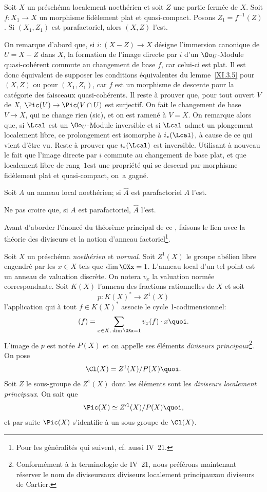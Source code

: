 \begin{lemme} \label{XI.3.6} Soit $X$ un pr\'esch\'ema localement noeth\'erien et soit $Z$ une partie ferm\'ee de $X$. Soit $f\colon X_1\to X$ un morphisme fid\`element plat et quasi-compact. Posons $Z_1=f^{-1}(Z)$. Si $(X_1, Z_1)$ est parafactoriel, alors $(X, Z)$ l'est.
\end{lemme}

On remarque d'abord que, si $i\colon(X-Z)\to X$ d\'esigne l'immersion canonique de $U=X-Z$ dans $X$, la formation de l'image directe par $i$ d'un $\Oo_U$-Module quasi-coh\'erent commute au changement de base $f$, car celui-ci est plat. Il est donc \'equivalent de supposer les conditions \'equivalentes du lemme~\ref{XI.3.5} pour $(X, Z)$ ou pour $(X_1, Z_1)$, car $f$ est un morphisme de descente pour la cat\'egorie des faisceaux quasi-coh\'erents. Il reste \`a prouver que, pour tout ouvert $V$ de $X$, $\Pic(V)\to\Pic(V\cap U)$ est surjectif. On fait le changement de base $V\to X$, qui ne change rien (sic), et on est ramen\'e \`a $V=X$. On remarque alors que, si ${\Lcal}$ est un $\Oo_U$-Module inversible et si ${\Lcal}$ admet un plongement localement libre, ce prolongement est isomorphe \`a $i_*({\Lcal})$, \`a cause de ce qui vient d'\^etre vu. Reste \`a prouver que $i_*({\Lcal})$ est inversible. Utilisant \`a nouveau le fait que l'image directe par $i$ commute au changement de base plat, et que \og localement libre de rang~$1$\fg est une propri\'et\'e qui se descend par morphisme fid\`element plat et quasi-compact, on~a gagn\'e.

\begin{corollaire} \label{XI.3.7} Soit $A$ un anneau local noeth\'erien; si $\hat A$ est parafactoriel $A$ l'est.
\end{corollaire}

Ne pas croire que, si $A$ est parafactoriel, $\hat A$ l'est.

\danger

Avant d'aborder l'\'enonc\'e du th\'eor\`eme principal de ce \no, faisons le lien avec la th\'eorie des diviseurs et la notion d'anneau factoriel\footnote{Pour les g\'en\'eralit\'es qui suivent, cf. aussi \EGA IV~21.}.

Soit $X$ un pr\'esch\'ema \emph{noethérien} et \emph{normal}. Soit $Z^1(X)$ le groupe ab\'elien libre engendr\'e par les $x\in X$ tels que $\dim\OXx=1$. L'anneau local d'un tel point est un anneau de valuation discr\`ete. On notera $v_x$ la valuation norm\'ee correspondante. Soit $K(X)$ l'anneau des fractions rationnelles de $X$ et soit
\[
p\colon K(X)^*\to Z^1(X)
\]
l'application qui \`a tout $f\in K(X)^*$ associe le cycle 1-codimensionnel:
\[
(f) = \sum_{x\in X, \;\dim\OXx=1} v_x(f)\cdot x{\quoi}.
\]
L'image de $p$ est not\'ee $P(X)$ et on appelle ses \'el\'ements \emph{diviseurs principaux}\footnote{Conform\'ement \`a la terminologie de \EGA IV~21, nous pr\'ef\'erons maintenant r\'eserver le nom de \og diviseurs\fg aux \og diviseurs localement principaux\fg ou \og diviseurs de Cartier\fg.}. On pose
\[
\Cl(X) = Z^1(X)/P(X){\quoi}.
\]
Soit $Z$ le sous-groupe de $Z^1(X)$ dont les \'el\'ements sont les \emph{diviseurs localement principaux}. On sait que
\[
\Pic(X)\simeq Z^{\prime1}(X)/P(X){\quoi},
\]
et par suite $\Pic(X)$ s'identifie \`a un sous-groupe de $\Cl(X)$.


